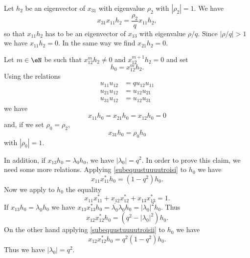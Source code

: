 Let \( h_2\) be an eigenvector of \( x_{31}\) with eigenvalue \( \rho_2\) with \( | \rho_2 |=1\). We have
\begin{equation}
    x_{31}x_{11}h_2=\frac{ \rho_2 }{ q }x_{11}h_2,
\end{equation}
so that \( x_{11}h_2\) has to be an eigenvector of \( x_{13}\) with eigenvalue \( \rho/q\). Since \( | \rho/q |>1\) we have \( x_{11}h_2=0\). In the same way we find \( x_{21}h_2=0\).

Let \( m\in\eN\) be such that \( x_{12}^mh_2\neq 0\) and \( x_{12}^{m+1}h_2=0\) and set
\begin{equation}
    h_0=x_{12}^mh_2.
\end{equation}
Using the relations
\begin{subequations}
    \begin{align}
        u_{11}u_{12}&=qu_{12}u_{11}\\
        u_{21}u_{12}&=u_{12}u_{21}\\
        u_{31}u_{12}&=u_{12}u_{31}
    \end{align}
\end{subequations}
we have
\begin{equation}
        x_{11}h_0=x_{21}h_0=x_{12}h_0=0
\end{equation}
and, if we set \( \rho_0=\rho_2\),
\begin{equation}
    x_{31}h_0=\rho_0h_0
\end{equation}
with \( | \rho_0 |=1\). 

In addition, if \( x_{13}h_0=\lambda_0h_0\), we have \( | \lambda_0 |=q^2\). In order to prove this claim, we need some more relations. Applying  \eqref{subequustuuuutroisi} to \( h_0\) we have
\begin{equation}
    x_{11}x_{11}^*h_0=(1-q^2)h_0.
\end{equation}
Now we apply to \( h_0\) the equality
\begin{equation}
    x_{11}x_{11}^*+x_{12}x_{12}^*+x_{13}x_{13}^*=1.
\end{equation}
If \( x_{13}h_0=\lambda_0h_0\) we have \( x_{13}x_{13}^*h_0=\overline{ \lambda_0 }\lambda_0h_0=| \lambda_0 |^2h_0\). Thus
\begin{equation}
    x_{12}x_{12}^*h_0=(q^2-| \lambda_0 |^2)h_0.
\end{equation}
On the other hand applying \eqref{subequustuuuutroisii} to \( h_0\) we have
\begin{equation}
    x_{12}x_{12}^*h_0=q^2(1-q^2)h_0.
\end{equation}
Thus we have \( | \lambda_0 |=q^2\).

